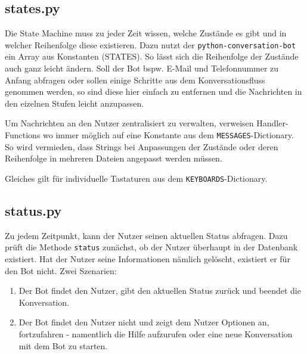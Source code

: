         \subsection{states.py} \label{Implementierung: states.py}
                Die State Machine muss zu jeder Zeit wissen, welche Zustände es gibt und in welcher Reihenfolge diese existieren. Dazu nutzt der \verb|python-conversation-bot| \cite{conversationBot} ein Array aus Konstanten (STATES). So lässt sich die Reihenfolge der Zustände auch ganz leicht ändern. Soll der Bot bspw. E-Mail und Telefonnummer zu Anfang abfragen oder sollen einige Schritte aus dem Konversationsfluss genommen werden, so sind diese hier einfach zu entfernen und die Nachrichten in den eizelnen Stufen leicht anzupassen.

                Um Nachrichten an den Nutzer zentralisiert zu verwalten, verweisen Handler-Functions wo immer möglich auf eine Konstante aus dem \verb|MESSAGES|-Dictionary. So wird vermieden, dass Strings bei Anpassungen der Zustände oder deren Reihenfolge in mehreren Dateien angepasst werden müssen.
            
                Gleiches gilt für individuelle Tastaturen aus dem \verb|KEYBOARDS|-Dictionary. 

        \subsection{status.py} \label{Implementierung: status.py}
                Zu jedem Zeitpunkt, kann der Nutzer seinen aktuellen Status abfragen. Dazu prüft die Methode \verb|status| zunächst, ob der Nutzer überhaupt in der Datenbank existiert. Hat der Nutzer seine Informationen nämlich gelöscht, existiert er für den Bot nicht. Zwei Szenarien: 
                \begin{enumerate}
                    \item Der Bot findet den Nutzer, gibt den aktuellen Status zurück und beendet die Konversation.
                    \item Der Bot findet den Nutzer nicht und zeigt dem Nutzer Optionen an, fortzufahren - namentlich die Hilfe aufzurufen oder eine neue Konversation mit dem Bot zu starten.
                \end{enumerate}
        

